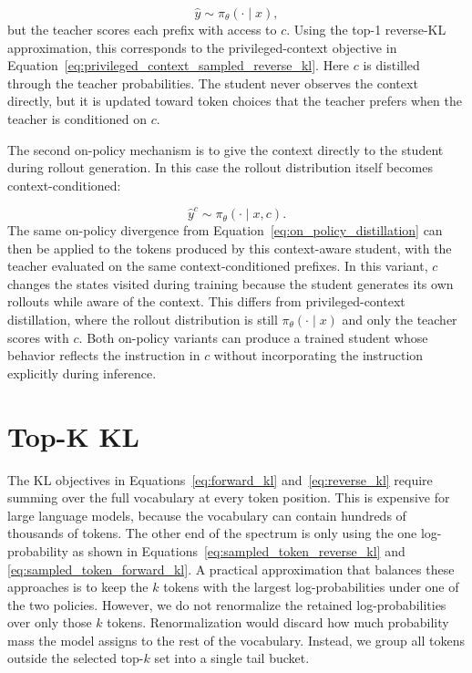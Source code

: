 \begin{equation}
\hat{y} \sim \pi_\theta(\cdot \mid x),
\end{equation}
%
but the teacher scores each prefix with access to $c$. Using the top-1 reverse-KL approximation, this corresponds to the privileged-context objective in Equation~\ref{eq:privileged_context_sampled_reverse_kl}.
%
Here $c$ is distilled through the teacher probabilities. The student never observes the context directly, but it is updated toward token choices that the teacher prefers when the teacher is conditioned on $c$.

The second on-policy mechanism is to give the context directly to the student during rollout generation. In this case the rollout distribution itself becomes context-conditioned:

\begin{equation}
\hat{y}^c \sim \pi_\theta(\cdot \mid x,c).
\end{equation}
%
The same on-policy divergence from Equation~\ref{eq:on_policy_distillation} can then be applied to the tokens produced by this context-aware student, with the teacher evaluated on the same context-conditioned prefixes. In this variant, $c$ changes the states visited during training because the student generates its own rollouts while aware of the context. This differs from privileged-context distillation, where the rollout distribution is still $\pi_\theta(\cdot \mid x)$ and only the teacher scores with $c$. Both on-policy variants can produce a trained student whose behavior reflects the instruction in $c$ without incorporating the instruction explicitly during inference.

\section{Top-K KL} \label{sec: top-k_kl}

The KL objectives in Equations~\ref{eq:forward_kl} and~\ref{eq:reverse_kl} require summing over the full vocabulary at every token position. This is expensive for large language models, because the vocabulary can contain hundreds of thousands of tokens. The other end of the spectrum is only using the one log-probability as shown in Equations~\ref{eq:sampled_token_reverse_kl} and \ref{eq:sampled_token_forward_kl}. A practical approximation that balances these approaches is to keep the $k$ tokens with the largest log-probabilities under one of the two policies. However, we do not renormalize the retained log-probabilities over only those $k$ tokens. Renormalization would discard how much probability mass the model assigns to the rest of the vocabulary. Instead, we group all tokens outside the selected top-$k$ set into a single tail bucket.

